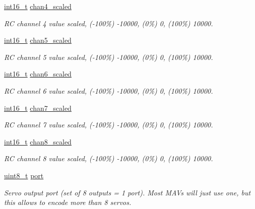 \begin{DoxyCompactItemize}
\hyperlink{stdint_8h_aa343fa3b3d06292b959ffdd4c4703b06}{int16\-\_\-t} \hyperlink{struct____mavlink__rc__channels__scaled__t_a707b8ff01d82e1ddb4aa440c60265315}{chan4\-\_\-scaled}
\begin{DoxyCompactList}\small\item\em R\-C channel 4 value scaled, (-\/100\%) -\/10000, (0\%) 0, (100\%) 10000. \end{DoxyCompactList}\item 
\hyperlink{stdint_8h_aa343fa3b3d06292b959ffdd4c4703b06}{int16\-\_\-t} \hyperlink{struct____mavlink__rc__channels__scaled__t_a746191bf8db147d0271f755814e62c5d}{chan5\-\_\-scaled}
\begin{DoxyCompactList}\small\item\em R\-C channel 5 value scaled, (-\/100\%) -\/10000, (0\%) 0, (100\%) 10000. \end{DoxyCompactList}\item 
\hyperlink{stdint_8h_aa343fa3b3d06292b959ffdd4c4703b06}{int16\-\_\-t} \hyperlink{struct____mavlink__rc__channels__scaled__t_a0554cbaeb193f0243986c02c6396b159}{chan6\-\_\-scaled}
\begin{DoxyCompactList}\small\item\em R\-C channel 6 value scaled, (-\/100\%) -\/10000, (0\%) 0, (100\%) 10000. \end{DoxyCompactList}\item 
\hyperlink{stdint_8h_aa343fa3b3d06292b959ffdd4c4703b06}{int16\-\_\-t} \hyperlink{struct____mavlink__rc__channels__scaled__t_a1e3c67b2bff9476d2c2da3e757993a1b}{chan7\-\_\-scaled}
\begin{DoxyCompactList}\small\item\em R\-C channel 7 value scaled, (-\/100\%) -\/10000, (0\%) 0, (100\%) 10000. \end{DoxyCompactList}\item 
\hyperlink{stdint_8h_aa343fa3b3d06292b959ffdd4c4703b06}{int16\-\_\-t} \hyperlink{struct____mavlink__rc__channels__scaled__t_a53c6f6016f7f9e8a93ed1b1b959e1de7}{chan8\-\_\-scaled}
\begin{DoxyCompactList}\small\item\em R\-C channel 8 value scaled, (-\/100\%) -\/10000, (0\%) 0, (100\%) 10000. \end{DoxyCompactList}\item 
\hyperlink{stdint_8h_aba7bc1797add20fe3efdf37ced1182c5}{uint8\-\_\-t} \hyperlink{struct____mavlink__rc__channels__scaled__t_a8781afa3337e7a7e4b88b66569dcdf5a}{port}
\begin{DoxyCompactList}\small\item\em Servo output port (set of 8 outputs = 1 port). Most M\-A\-Vs will just use one, but this allows to encode more than 8 servos. \end{DoxyCompactList}\item 

\end{DoxyCompactItemize}
